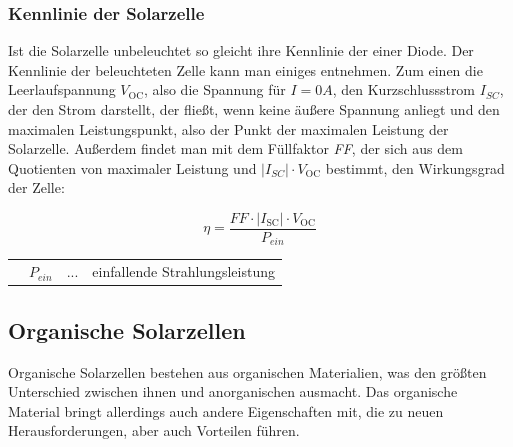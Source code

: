 \documentclass[slug=SZ, room=Hermann-Krone-Bau\,\ Labor\ 1.25,
supervisor=Martin\ Kroll, coursedate=14.\ 11.\ 2019]{../../Lab_Report_LaTeX/lab_report}
\newcommand{\voc}{V_{\text{OC}}}
\newcommand{\isc}{I_{\text{SC}}}
\begin{document}
\subsubsection{Kennlinie der Solarzelle}

Ist die Solarzelle unbeleuchtet so gleicht ihre Kennlinie der einer Diode.
Der Kennlinie der beleuchteten Zelle kann man einiges entnehmen.
Zum einen die Leerlaufspannung \(\voc\), also die Spannung für \(I=0 A\), den Kurzschlussstrom \(I_{SC}\), der den
Strom darstellt, der fließt, wenn keine äußere Spannung anliegt und den maximalen Leistungspunkt, also der Punkt
der maximalen Leistung der Solarzelle. Außerdem findet man mit dem Füllfaktor \emph{FF}, der sich aus dem
Quotienten von maximaler Leistung und \(|I_{SC}| \cdot \voc\) bestimmt, den Wirkungsgrad der Zelle:

\begin{equation}\label{eq:wirkgrad}
        \eta = \frac{FF \cdot |\isc| \cdot \voc}{P_{ein}}
\end{equation}

\begin{tabular}{llll}
         & \(P_{ein}\) & ... & einfallende Strahlungsleistung
\end{tabular}

\subsection{Organische Solarzellen}
\label{sec:orgsolar}

Organische Solarzellen bestehen aus organischen Materialien, was den größten
Unterschied zwischen ihnen und anorganischen ausmacht.
Das organische Material bringt allerdings auch andere Eigenschaften mit, die zu neuen Herausforderungen, aber
auch Vorteilen führen.\\
\end{document}

